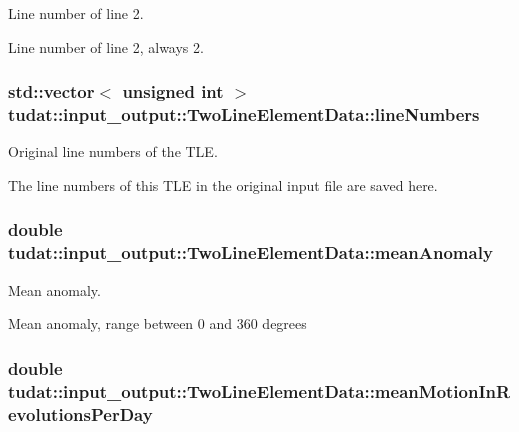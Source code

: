 Line number of line 2. 

Line number of line 2, always \textquotesingle{}2\textquotesingle{}. 
\subsubsection[{\texorpdfstring{line\+Numbers}{lineNumbers}}]{\setlength{\rightskip}{0pt plus 5cm}std\+::vector$<$ unsigned int $>$ tudat\+::input\+\_\+output\+::\+Two\+Line\+Element\+Data\+::line\+Numbers}\hypertarget{structtudat_1_1input__output_1_1TwoLineElementData_afbbc6c45454595ec579db0ea0b490206}{}\label{structtudat_1_1input__output_1_1TwoLineElementData_afbbc6c45454595ec579db0ea0b490206}


Original line numbers of the T\+LE. 

The line numbers of this T\+LE in the original input file are saved here. 
\subsubsection[{\texorpdfstring{mean\+Anomaly}{meanAnomaly}}]{\setlength{\rightskip}{0pt plus 5cm}double tudat\+::input\+\_\+output\+::\+Two\+Line\+Element\+Data\+::mean\+Anomaly}\hypertarget{structtudat_1_1input__output_1_1TwoLineElementData_abb5a27435eb2fcefd5fab5d3d0455a70}{}\label{structtudat_1_1input__output_1_1TwoLineElementData_abb5a27435eb2fcefd5fab5d3d0455a70}


Mean anomaly. 

Mean anomaly, range between 0 and 360 degrees 
\subsubsection[{\texorpdfstring{mean\+Motion\+In\+Revolutions\+Per\+Day}{meanMotionInRevolutionsPerDay}}]{\setlength{\rightskip}{0pt plus 5cm}double tudat\+::input\+\_\+output\+::\+Two\+Line\+Element\+Data\+::mean\+Motion\+In\+Revolutions\+Per\+Day}\hypertarget{structtudat_1_1input__output_1_1TwoLineElementData_a15ed418187dcd128fc66c6dfd244a2df}{}\label{structtudat_1_1input__output_1_1TwoLineElementData_a15ed418187dcd128fc66c6dfd244a2df}


